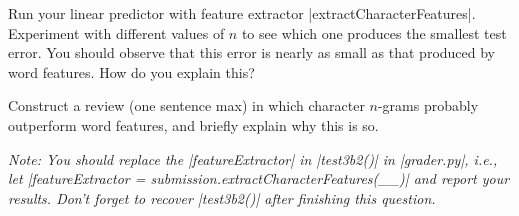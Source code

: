 \item {}

Run your linear predictor with feature extractor |extractCharacterFeatures|.
Experiment with different values of $n$ to see which one produces the smallest
test error.  You should observe that this error is nearly as small as that
produced by word features.  How do you explain this?

Construct a review (one sentence max) in which character $n$-grams probably
outperform word features, and briefly explain why this is so.

{\em Note: You should replace the |featureExtractor| in |test3b2()| in
|grader.py|, i.e., let
|featureExtractor = submission.extractCharacterFeatures(\_\_)| and report your
results. Don't forget to recover |test3b2()| after finishing this question.}
